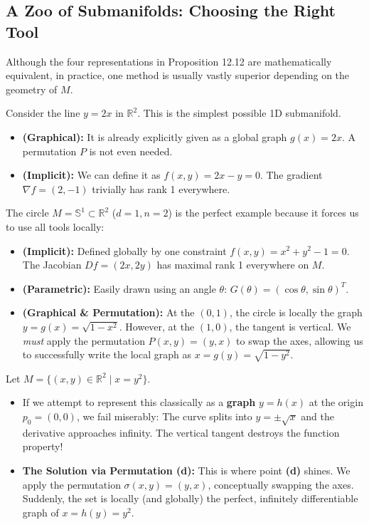 \subsection{A Zoo of Submanifolds: Choosing the Right Tool}

Although the four representations in Proposition 12.12 are mathematically equivalent, in practice, one method is usually vastly superior depending on the geometry of $M$. 

\begin{example}
Consider the line $y = 2x$ in $\mathbb{R}^2$. This is the simplest possible 1D submanifold. 
\begin{itemize}
    \item \textbf{(Graphical):} It is already explicitly given as a global graph $g(x) = 2x$. A permutation $P$ is not even needed.
    \item \textbf{(Implicit):} We can define it as $f(x,y) = 2x - y = 0$. The gradient $\nabla f = (2, -1)$ trivially has rank 1 everywhere.
\end{itemize}
\end{example}

\begin{example}
The circle $M = \mathbb{S}^1 \subset \mathbb{R}^2$ ($d=1, n=2$) is the perfect example because it forces us to use all tools locally:
\begin{itemize}
    \item \textbf{(Implicit):} Defined globally by one constraint $f(x, y) = x^2 + y^2 - 1 = 0$. The Jacobian $Df = (2x, 2y)$ has maximal rank 1 everywhere on $M$.
    \item \textbf{(Parametric):} Easily drawn using an angle $\theta$: $G(\theta) = (\cos\theta, \sin\theta)^T$.
    \item \textbf{(Graphical \& Permutation):} At the  $(0,1)$, the circle is locally the graph $y = g(x) = \sqrt{1-x^2}$. However, at the  $(1,0)$, the tangent is vertical. We \emph{must} apply the permutation $P(x,y) = (y,x)$ to swap the axes, allowing us to successfully write the local graph as $x = g(y) = \sqrt{1-y^2}$.
\end{itemize}
\end{example}

\begin{example}
Let $M = \{(x,y) \in \mathbb{R}^2 \mid x = y^2\}$. 
\begin{itemize}
    \item If we attempt to represent this classically as a \textbf{graph} $y = h(x)$ at the origin $p_0 = (0,0)$, we fail miserably: The curve splits into $y = \pm\sqrt{x}$ and the derivative approaches infinity. The vertical tangent destroys the function property!
    \item \textbf{The Solution via Permutation (d):} This is where point \textbf{(d)} shines. We apply the permutation $\sigma(x,y) = (y,x)$, conceptually swapping the axes. Suddenly, the set is locally (and globally) the perfect, infinitely differentiable graph of $x = h(y) = y^2$.
\end{itemize}
\end{example}


